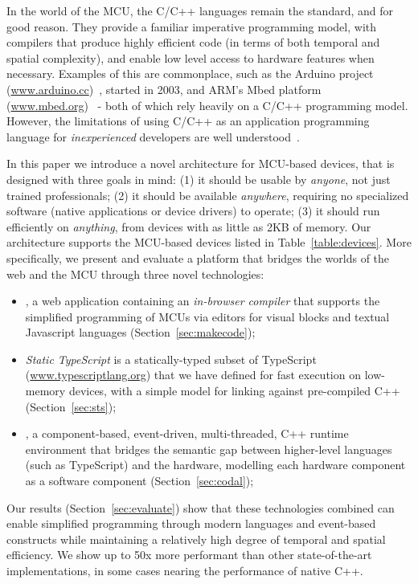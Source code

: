 In the world of the MCU, the C/C++ languages remain the standard, and for good reason.
They provide a familiar imperative programming model, with compilers that produce highly efficient code (in terms of both
temporal and spatial complexity), and enable low level access to hardware features when necessary. Examples
of this are commonplace, such as the Arduino project (\url{www.arduino.cc})~\cite{buildingArduino2014},
started in 2003, and ARM's Mbed platform (\url{www.mbed.org})~\cite{ARMmbed} - both of which rely heavily on
a C/C++ programming model. However, the limitations of using C/C++ as an application programming language for
\emph{inexperienced} developers are well understood~\cite{blikstein2013gears}.

In this paper we introduce a novel architecture for MCU-based devices,
that is designed with three goals in mind:
(1) it should be usable by \emph{anyone}, not just trained professionals;
(2) it should be available \emph{anywhere}, requiring no specialized software (native applications
or device drivers) to operate;
(3) it should run efficiently on \emph{anything}, from devices with as little as 2KB of memory. Our architecture supports the MCU-based devices listed in Table~\ref{table:devices}.
More specifically, we present and evaluate a platform that bridges the worlds of the web and the
MCU through three novel technologies:

\begin{itemize}
\item \emph{\MCN}, a web application containing an \emph{in-browser compiler} that supports the
simplified programming of MCUs via editors for visual blocks and textual Javascript languages
(Section~\ref{sec:makecode});

\item \emph{Static TypeScript} is a statically-typed subset of TypeScript
(\url{www.typescriptlang.org}) that we have defined for fast execution on low-memory devices,
with a simple model for linking against pre-compiled C++ (Section~\ref{sec:sts});

\item \emph{\CO}, a component-based, event-driven, multi-threaded, C++ runtime environment
that bridges the semantic gap between higher-level languages (such as TypeScript) and the hardware,
modelling each hardware component as a software component (Section~\ref{sec:codal});
\end{itemize}
Our results (Section~\ref{sec:evaluate}) show that these technologies combined can enable simplified programming through modern
languages and event-based constructs while maintaining a relatively high degree of temporal and spatial efficiency.
We show up to 50x more performant than other state-of-the-art implementations,
in some cases nearing the performance of native C++.

